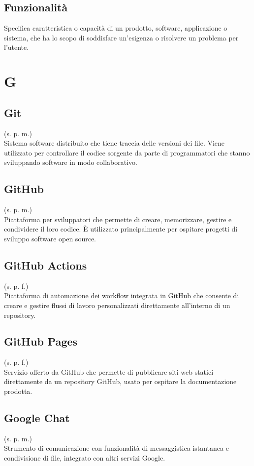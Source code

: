 \subsection{Funzionalità}
\label{Funzionalità}
Specifica caratteristica o capacità di un prodotto, software, applicazione o sistema,
che ha lo scopo di soddisfare un'esigenza o risolvere un problema per l'utente.
\pagebreak
\section{G}
\subsection{Git}
\label{Git}
(s. p. m.)\\
Sistema software distribuito che tiene traccia delle versioni dei file.
Viene utilizzato per controllare il codice sorgente da parte di programmatori
che stanno sviluppando software in modo collaborativo.
\subsection{GitHub}
\label{GitHub}
(s. p. m.)\\
Piattaforma per sviluppatori che permette di creare, memorizzare, gestire
e condividere il loro codice. È utilizzato principalmente per ospitare
progetti di sviluppo software open source.
\subsection{GitHub Actions}
\label{GitHub Actions}
(s. p. f.)\\
Piattaforma di automazione dei workflow integrata in GitHub che consente
di creare e gestire flussi di lavoro personalizzati direttamente all'interno
di un repository.
\subsection{GitHub Pages}
\label{GitHub Pages}
(s. p. f.)\\
Servizio offerto da GitHub che permette di pubblicare siti web statici direttamente da un repository GitHub,
usato per ospitare la documentazione prodotta.
\subsection{Google Chat}
(s. p. m.)\\
Strumento di comunicazione con funzionalità di messaggistica
istantanea e condivisione di file, integrato con altri servizi Google.
